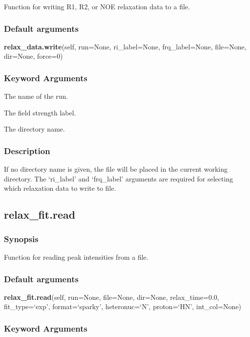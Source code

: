Function for writing R1, R2, or NOE relaxation data to a file.

\subsubsection{Default arguments}

\textsf{\textbf{relax\_data.write}(self, run=None, ri\_label=None, frq\_label=None, file=None, dir=None, force=0)}


\subsubsection{Keyword Arguments}

  The name of the run.

  The field strength label.

  The directory name.


\subsubsection{Description}

If no directory name is given, the file will be placed in the current working directory.
The `ri\_label' and `frq\_label' arguments are required for selecting which relaxation data
to write to file.


\newpage

\subsection{relax\_fit.read}


\subsubsection{Synopsis}

Function for reading peak intensities from a file.

\subsubsection{Default arguments}

\textsf{\textbf{relax\_fit.read}(self, run=None, file=None, dir=None, relax\_time=0.0, fit\_type=`exp', format=`sparky', heteronuc=`N', proton=`HN', int\_col=None)}


\subsubsection{Keyword Arguments}

